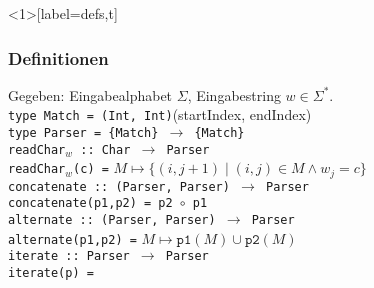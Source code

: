 \documentclass{beamer}
\begin{document}
    \begin{frame}<1>[label=defs,t]
        \frametitle{Definitionen}
        Gegeben: Eingabealphabet $\Sigma$, Eingabestring $w \in \Sigma^*$.\\[10pt]
        \pause
        \texttt{type Match = (Int, Int)}\hfill(startIndex, endIndex)\\
        \pause
        \texttt{type Parser = \{Match\} $\to$ \{Match\}}\\[10pt]
        \pause
        \texttt{readChar$_w$ ::\ Char $\to$ Parser}\\
        \texttt{readChar$_w$(c) =}
        \pause
        \pause
        $M \mapsto \{(i, j+1) \mid (i,j) \in M \land w_j = c\}$\\[10pt]
        \texttt{concatenate ::\ (Parser, Parser) $\to$ Parser}\\
        \pause
        \texttt{concatenate(p1,p2) = p2 $\circ$ p1}\\[10pt]
        \pause
        \texttt{alternate ::\ (Parser, Parser) $\to$ Parser}\\
        \pause
        \texttt{alternate(p1,p2) =} $M \mapsto \texttt{p1}(M) \cup \texttt{p2}(M)$\\[10pt]
        \pause
        \texttt{iterate ::\ Parser $\to$ Parser}\\
        \texttt{iterate(p) =}
        \pause
    \end{frame}

\end{document}
